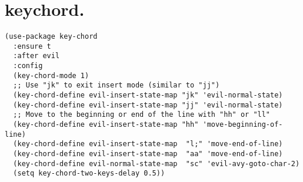 \documentclass[11pt]{article}
\begin{document}
\section{keychord.}
\label{sec:org77499e7}
\begin{verbatim}
(use-package key-chord
  :ensure t
  :after evil
  :config
  (key-chord-mode 1)
  ;; Use "jk" to exit insert mode (similar to "jj")
  (key-chord-define evil-insert-state-map "jk" 'evil-normal-state)
  (key-chord-define evil-insert-state-map "jj" 'evil-normal-state)
  ;; Move to the beginning or end of the line with "hh" or "ll"
  (key-chord-define evil-insert-state-map "hh" 'move-beginning-of-line)
  (key-chord-define evil-insert-state-map  "l;" 'move-end-of-line)
  (key-chord-define evil-insert-state-map  "aa" 'move-end-of-line)
  (key-chord-define evil-normal-state-map  "sc" 'evil-avy-goto-char-2)
  (setq key-chord-two-keys-delay 0.5))
\end{verbatim}
\end{document}
